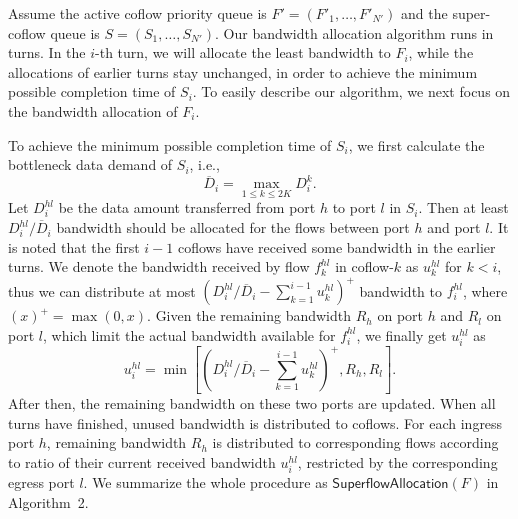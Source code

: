 \documentclass[10pt, conference, letterpaper]{IEEEtran}
\begin{document}
Assume the active coflow priority queue is $F'=(F'_1,\dots,F'_{N'})$ and the super-coflow queue is $S = (S_1,\dots,S_{N'})$. Our bandwidth allocation algorithm runs in turns. In the $i$-th turn, we will allocate the least bandwidth to $F_i$, while the allocations of earlier turns stay unchanged,  in order to achieve the minimum possible completion time of $S_i$. To easily describe our algorithm, we next focus on the bandwidth allocation of $F_i$.

To achieve the minimum possible completion time of $S_i$, we first calculate the bottleneck data demand of $S_i$, i.e.,
\begin{equation}
	\overline{D}_i = \max_{1\leq k\leq 2K}D_i^k.
\end{equation}
Let $D_i^{hl}$ be the data amount transferred from port $h$ to port $l$ in $S_i$. Then at least $D_i^{hl}/\overline{D}_i$ bandwidth should be allocated for the flows between port $h$ and port $l$. It is noted that the first $i-1$ coflows have received some bandwidth in the earlier turns. We denote the bandwidth received by flow $f_k^{hl}$ in coflow-$k$ as $u_k^{hl}$ for $k < i$, thus we can distribute at most $(D_i^{hl}/\overline{D}_i - \sum_{k=1}^{i-1}u_k^{hl})^+$ bandwidth to $f_i^{hl}$, where $(x)^+=\max(0,x)$. Given the remaining bandwidth $R_h$ on port $h$ and $R_l$ on port $l$, which limit the actual bandwidth available for $f_i^{hl}$, we finally get $u_i^{hl}$ as
\begin{equation}
	u_i^{hl} = \min[(D_i^{hl}/\overline{D}_i - \sum_{k=1}^{i-1}u_k^{hl})^+,R_h,R_l].
\end{equation}
After then, the remaining bandwidth on these two ports are updated. When all turns have finished, unused bandwidth is distributed to coflows. For each ingress port $h$, remaining bandwidth $R_h$ is distributed to corresponding flows according to ratio of their current received bandwidth $u_i^{hl}$, restricted by the corresponding egress port $l$. We summarize the whole procedure as $\mathsf{SuperflowAllocation}(F)$ in Algorithm~2.
\end{document}
